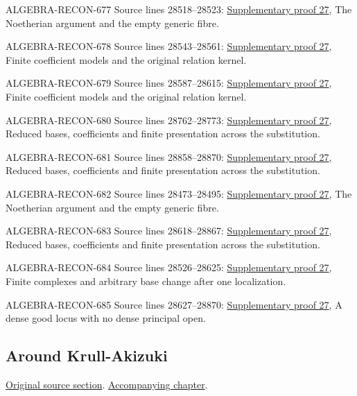 \begin{AlgebraSourceRoutes}
\item[ALGEBRA-RECON-677] Source lines 28518--28523: \hyperlink{algebra_generic_freeness_notes_20260928}{Supplementary proof 27}, The Noetherian argument and the empty generic fibre.
\item[ALGEBRA-RECON-678] Source lines 28543--28561: \hyperlink{algebra_generic_freeness_notes_20260928}{Supplementary proof 27}, Finite coefficient models and the original relation kernel.
\item[ALGEBRA-RECON-679] Source lines 28587--28615: \hyperlink{algebra_generic_freeness_notes_20260928}{Supplementary proof 27}, Finite coefficient models and the original relation kernel.
\item[ALGEBRA-RECON-680] Source lines 28762--28773: \hyperlink{algebra_generic_freeness_notes_20260928}{Supplementary proof 27}, Reduced bases, coefficients and finite presentation across the substitution.
\item[ALGEBRA-RECON-681] Source lines 28858--28870: \hyperlink{algebra_generic_freeness_notes_20260928}{Supplementary proof 27}, Reduced bases, coefficients and finite presentation across the substitution.
\item[ALGEBRA-RECON-682] Source lines 28473--28495: \hyperlink{algebra_generic_freeness_notes_20260928}{Supplementary proof 27}, The Noetherian argument and the empty generic fibre.
\item[ALGEBRA-RECON-683] Source lines 28618--28867: \hyperlink{algebra_generic_freeness_notes_20260928}{Supplementary proof 27}, Reduced bases, coefficients and finite presentation across the substitution.
\item[ALGEBRA-RECON-684] Source lines 28526--28625: \hyperlink{algebra_generic_freeness_notes_20260928}{Supplementary proof 27}, Finite complexes and arbitrary base change after one localization.
\item[ALGEBRA-RECON-685] Source lines 28627--28870: \hyperlink{algebra_generic_freeness_notes_20260928}{Supplementary proof 27}, A dense good locus with no dense principal open.
\end{AlgebraSourceRoutes}

\subsection{Around Krull-Akizuki}
\hypertarget{algebra-source-section-krull-akizuki}{}
\noindent\href{https://github.com/stacks/stacks-project/blob/a04446e57ec1fbc252a871afcec7752fb2807b14/algebra.tex\#L28877}{Original source section}. \href{algebra.pdf\#nameddest=section-krull-akizuki}{Accompanying chapter}.

